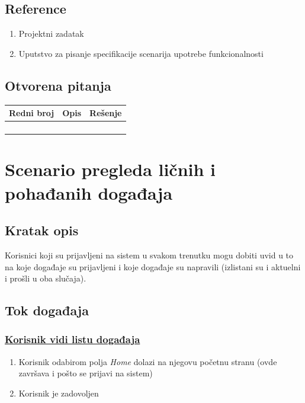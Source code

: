 \documentclass[11pt,a4paper]{article}
\begin{document}
\subsection{Reference}
\begin{enumerate}
    \item Projektni zadatak
    \item Uputstvo za pisanje specifikacije scenarija upotrebe funkcionalnosti
\end{enumerate}
\subsection{Otvorena pitanja}
\begin{center}
\begin{tabular}{| >{\centering\arraybackslash}m{1.9cm} | >{\centering\arraybackslash}m{4.9cm} | >{\centering\arraybackslash}m{4.9cm} |}
\hline
\rowcolor[HTML]{000000} 
{\color[HTML]{FFFFFF} Redni broj } & {\color[HTML]{FFFFFF} Opis } & {\color[HTML]{FFFFFF} Rešenje } \\ \hline
 &  & \\ \hline
 &  &  \\ \hline
 &  &  \\ \hline
 &  &  \\ \hline
\end{tabular}
\end{center}

\newpage

\section{Scenario pregleda ličnih i pohađanih događaja}
\subsection{Kratak opis}
Korisnici koji su prijavljeni na sistem u svakom trenutku mogu dobiti uvid u to na koje događaje su prijavljeni i koje događaje su napravili (izlistani su i aktuelni i prošli u oba slučaja).
\subsection{Tok događaja}
\subsubsection{\underline{Korisnik vidi listu događaja}}
\begin{enumerate}
    \item Korisnik odabirom polja \textit{Home} dolazi na njegovu početnu stranu (ovde završava i pošto se prijavi na sistem)
    \item Korisnik je zadovoljen
\end{enumerate}
\end{document}
